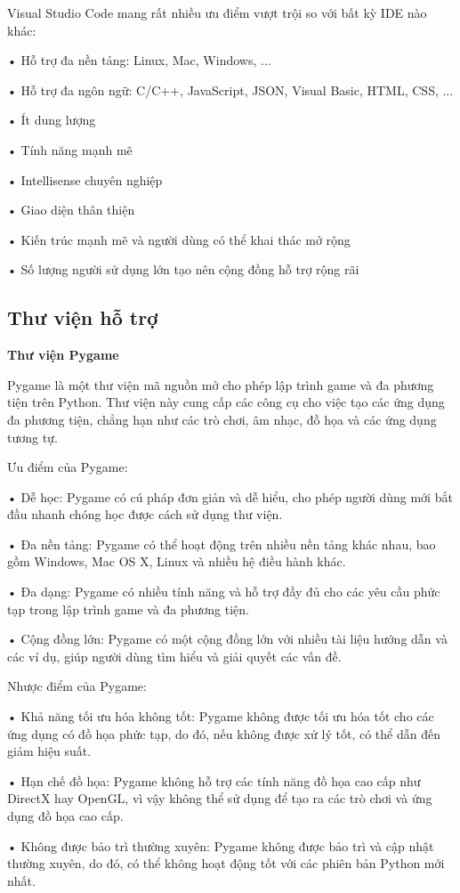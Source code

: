 \documentclass[a4paper]{article}
\begin{document}
	Visual Studio Code mang rất nhiều ưu điểm vượt trội so với bất kỳ IDE nào khác:

	•	Hỗ trợ đa nền tảng: Linux, Mac, Windows, ...

	•	Hỗ trợ đa ngôn ngữ: C/C++, JavaScript, JSON, Visual Basic, HTML, CSS, ...

	•	Ít dung lượng

	•	Tính năng mạnh mẽ

	•	Intellisense chuyên nghiệp

	•	Giao diện thân thiện

	•	Kiến trúc mạnh mẽ và người dùng có thể khai thác mở rộng

	•	Số lượng người sử dụng lớn tạo nên cộng đồng hỗ trợ rộng rãi

	

	\subsection{Thư viện hỗ trợ}
	\textbf{ Thư viện Pygame}

	Pygame là một thư viện mã nguồn mở cho phép lập trình game và đa phương tiện trên Python. Thư viện này cung cấp các công cụ cho việc tạo các ứng dụng đa phương tiện, chẳng hạn như các trò chơi, âm nhạc, đồ họa và các ứng dụng tương tự.

	Ưu điểm của Pygame:

	•	Dễ học: Pygame có cú pháp đơn giản và dễ hiểu, cho phép người dùng mới bắt đầu nhanh chóng học được cách sử dụng thư viện.

	•	Đa nền tảng: Pygame có thể hoạt động trên nhiều nền tảng khác nhau, bao gồm Windows, Mac OS X, Linux và nhiều hệ điều hành khác.

	•	Đa dạng: Pygame có nhiều tính năng và hỗ trợ đầy đủ cho các yêu cầu phức tạp trong lập trình game và đa phương tiện.

	•	Cộng đồng lớn: Pygame có một cộng đồng lớn với nhiều tài liệu hướng dẫn và các ví dụ, giúp người dùng tìm hiểu và giải quyết các vấn đề.

	Nhược điểm của Pygame:

	•	Khả năng tối ưu hóa không tốt: Pygame không được tối ưu hóa tốt cho các ứng dụng có đồ họa phức tạp, do đó, nếu không được xử lý tốt, có thể dẫn đến giảm hiệu suất.

	•	Hạn chế đồ họa: Pygame không hỗ trợ các tính năng đồ họa cao cấp như DirectX hay OpenGL, vì vậy không thể sử dụng để tạo ra các trò chơi và ứng dụng đồ họa cao cấp.

	•	Không được bảo trì thường xuyên: Pygame không được bảo trì và cập nhật thường xuyên, do đó, có thể không hoạt động tốt với các phiên bản Python mới nhất.
\end{document}
